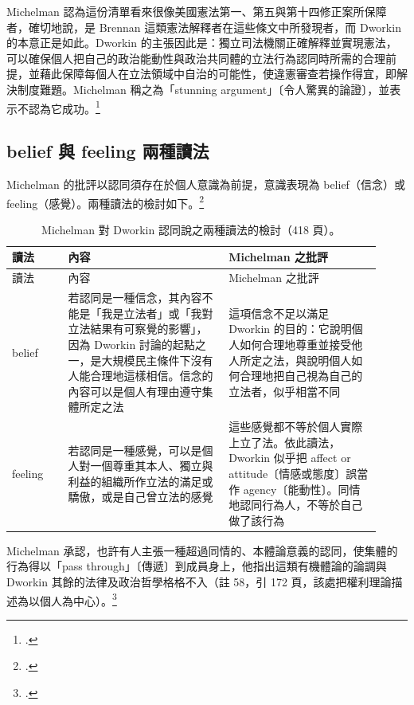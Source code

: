 Michelman 認為這份清單看來很像美國憲法第一、第五與第十四修正案所保障者，確切地說，是 Brennan 這類憲法解釋者在這些條文中所發現者，而 Dworkin 的本意正是如此。Dworkin 的主張因此是：獨立司法機關正確解釋並實現憲法，可以確保個人把自己的政治能動性與政治共同體的立法行為認同時所需的合理前提，並藉此保障每個人在立法領域中自治的可能性，使違憲審查若操作得宜，即解決制度難題。Michelman 稱之為「stunning argument」〔令人驚異的論證〕，並表示不認為它成功。\footcite[417]{michelman1998}

\subsection{belief 與 feeling 兩種讀法}

Michelman 的批評以認同須存在於個人意識為前提，意識表現為 belief（信念）或 feeling（感覺）。兩種讀法的檢討如下。\footcite[418]{michelman1998}

\begin{longtable}{@{}L{0.14\linewidth}L{0.40\linewidth}L{0.38\linewidth}@{}}
\caption{Michelman 對 Dworkin 認同說之兩種讀法的檢討（418 頁）。}\\
\toprule
讀法 & 內容 & Michelman 之批評 \\
\midrule
\endfirsthead
\toprule
讀法 & 內容 & Michelman 之批評 \\
\midrule
\endhead
belief & 若認同是一種信念，其內容不能是「我是立法者」或「我對立法結果有可察覺的影響」，因為 Dworkin 討論的起點之一，是大規模民主條件下沒有人能合理地這樣相信。信念的內容可以是個人有理由遵守集體所定之法 & 這項信念不足以滿足 Dworkin 的目的：它說明個人如何合理地尊重並接受他人所定之法，與說明個人如何合理地把自己視為自己的立法者，似乎相當不同 \\
feeling & 若認同是一種感覺，可以是個人對一個尊重其本人、獨立與利益的組織所作立法的滿足或驕傲，或是自己曾立法的感覺 & 這些感覺都不等於個人實際上立了法。依此讀法，Dworkin 似乎把 affect or attitude〔情感或態度〕誤當作 agency〔能動性〕。同情地認同行為人，不等於自己做了該行為 \\
\bottomrule
\end{longtable}

Michelman 承認，也許有人主張一種超過同情的、本體論意義的認同，使集體的行為得以「pass through」〔傳遞〕到成員身上，他指出這類有機體論的論調與 Dworkin 其餘的法律及政治哲學格格不入（註 58，引  172 頁，該處把權利理論描述為以個人為中心）。\footcite[418 \& n.58]{michelman1998}

